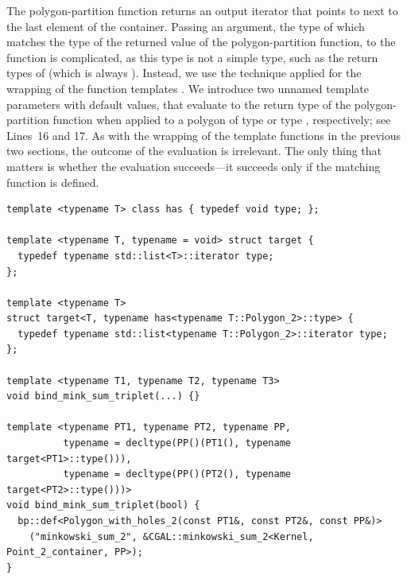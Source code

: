 The polygon-partition function returns an output iterator that points 
to next to the last element of the container. Passing an argument, the 
type of which matches the type of the returned value of the 
polygon-partition function, to the function 
 is complicated, as this type is
not a simple type, such as the return types of 
 (which is always 
). Instead, we use the technique applied for the 
wrapping of the function templates .
We introduce two unnamed template parameters with default values, 
that evaluate to the return type of the polygon-partition function
when applied to a polygon of type  or type 
, respectively; see Lines~16 and 17. As with the 
wrapping of the template functions in the previous two sections, 
the outcome of the evaluation is irrelevant. The only thing that 
matters is whether the evaluation succeeds---it succeeds only if the 
matching function is defined.

\begin{lstfloat}
  \begin{lstlisting}[style=cppFramedStyle,basicstyle=\normalsize,
                     label=lst:minkSumResolution,
                     caption={Automatic generation of binding for \cppLstinline{CGAL::minkowski_sum_2} exploiting SFINAE.}]
template <typename T> class has { typedef void type; };

template <typename T, typename = void> struct target {
  typedef typename std::list<T>::iterator type;
};

template <typename T>
struct target<T, typename has<typename T::Polygon_2>::type> {
  typedef typename std::list<typename T::Polygon_2>::iterator type;
};

template <typename T1, typename T2, typename T3>
void bind_mink_sum_triplet(...) {}

template <typename PT1, typename PT2, typename PP,
          typename = decltype(PP()(PT1(), typename target<PT1>::type())),
          typename = decltype(PP()(PT2(), typename target<PT2>::type()))>
void bind_mink_sum_triplet(bool) {
  bp::def<Polygon_with_holes_2(const PT1&, const PT2&, const PP&)>
    ("minkowski_sum_2", &CGAL::minkowski_sum_2<Kernel, Point_2_container, PP>);
}
  \end{lstlisting}
\end{lstfloat}



